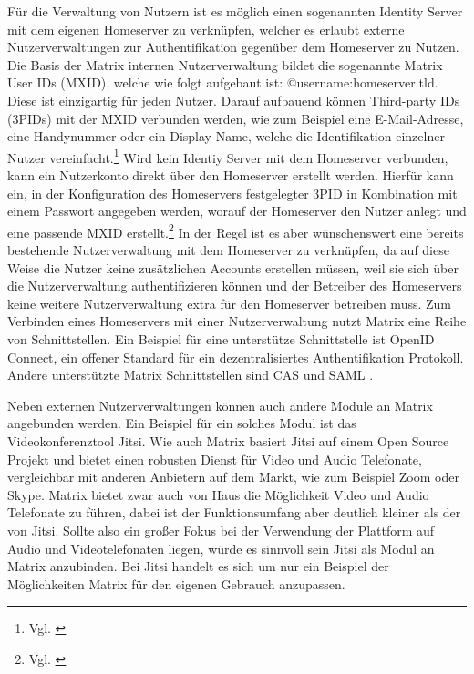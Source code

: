 Für die Verwaltung von Nutzern ist es möglich einen sogenannten Identity Server mit dem eigenen Homeserver zu verknüpfen, welcher es erlaubt externe Nutzerverwaltungen zur Authentifikation gegenüber dem Homeserver zu Nutzen. Die Basis der Matrix internen Nutzerverwaltung bildet die sogenannte Matrix User IDs (MXID), welche wie folgt aufgebaut ist: \glqq @username:homeserver.tld\grqq{}. Diese ist einzigartig für jeden Nutzer. Darauf aufbauend können Third-party IDs (3PIDs) mit der MXID verbunden werden, wie zum Beispiel eine E-Mail-Adresse, eine Handynummer oder ein Display Name, welche die Identifikation einzelner Nutzer vereinfacht.\footnote{Vgl. \cite{Matirx.org-specifications2020}}
Wird kein Identiy Server mit dem Homeserver verbunden, kann ein Nutzerkonto direkt über den Homeserver erstellt werden. Hierfür kann ein, in der Konfiguration des Homeservers festgelegter 3PID in Kombination mit einem Passwort angegeben werden, worauf der Homeserver den Nutzer anlegt und eine passende MXID erstellt.\footnote{Vgl. \cite{Matirx.org-specifications2020}}
In der Regel ist es aber wünschenswert eine bereits bestehende Nutzerverwaltung mit dem Homeserver zu verknüpfen, da auf diese Weise die Nutzer keine zusätzlichen Accounts erstellen müssen, weil sie sich über die Nutzerverwaltung authentifizieren können und der Betreiber des Homeservers keine weitere Nutzerverwaltung extra für den Homeserver betreiben muss. Zum Verbinden eines Homeservers mit einer Nutzerverwaltung nutzt Matrix eine Reihe von Schnittstellen. Ein Beispiel für eine unterstütze Schnittstelle ist OpenID Connect, ein offener Standard für ein dezentralisiertes Authentifikation Protokoll. Andere unterstützte Matrix Schnittstellen sind CAS und SAML .

Neben externen Nutzerverwaltungen können auch andere Module an Matrix angebunden werden. Ein Beispiel für ein solches Modul ist das Videokonferenztool Jitsi. Wie auch Matrix basiert Jitsi auf einem Open Source Projekt und bietet einen robusten Dienst für Video und Audio Telefonate, vergleichbar mit anderen Anbietern auf dem Markt, wie zum Beispiel Zoom oder Skype. Matrix bietet zwar auch von Haus die Möglichkeit Video und Audio Telefonate zu führen, dabei ist der Funktionsumfang aber deutlich kleiner als der von Jitsi. Sollte also ein großer Fokus bei der Verwendung der Plattform auf Audio und Videotelefonaten liegen, würde es sinnvoll sein Jitsi als Modul an Matrix anzubinden. Bei Jitsi handelt es sich um nur ein Beispiel der Möglichkeiten Matrix für den eigenen Gebrauch anzupassen. 


